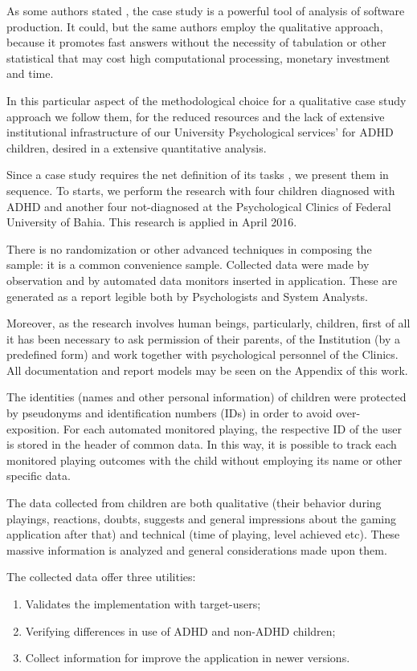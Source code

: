 As some authors stated \citep{Lauri-2011}, the case study is a powerful tool of analysis of software production. It could, but the same authors employ the qualitative approach, because it promotes fast answers without the necessity of tabulation or other statistical that may cost high computational processing, monetary investment and time. 

In this particular aspect of the methodological choice for a qualitative case study approach we follow them, for the reduced resources and the lack of extensive institutional infrastructure of our University Psychological services' for ADHD children, desired in a extensive quantitative analysis.

Since a case study requires the net definition of its tasks \citep{Lauri-2011}, we present them in sequence. To starts, we perform the research with four children diagnosed with ADHD and another four not-diagnosed at the Psychological Clinics of Federal University of Bahia. This research is applied in April 2016. 

There is no randomization or other advanced techniques in composing the sample: it is a common convenience sample. Collected data were made by observation and by automated data monitors inserted in application. These are generated as a report legible both by Psychologists and System Analysts.

Moreover, as the research involves human beings, particularly, children, first of all it has been necessary to ask permission of their parents, of the Institution (by a predefined form) and work together with psychological personnel of the Clinics. All documentation and report models may be seen on the Appendix of this work.

The identities (names and other personal information) of children were protected by pseudonyms and identification numbers (IDs)  in order to avoid over-exposition. For each automated monitored playing, the respective ID of the user is stored in the header of common data. In this way, it is possible to track each monitored playing outcomes with the child without employing its name or other specific data.

The data collected from children are both qualitative (their behavior during playings, reactions, doubts, suggests and general impressions about the gaming application after that) and technical (time of playing, level achieved etc). These massive information is analyzed and general considerations made upon them.

The collected data offer three utilities: 
\begin{enumerate}
\item Validates the implementation with target-users;
\item Verifying differences in use of ADHD and non-ADHD children;
\item Collect information for improve the application in newer versions.
\end{enumerate}
	

